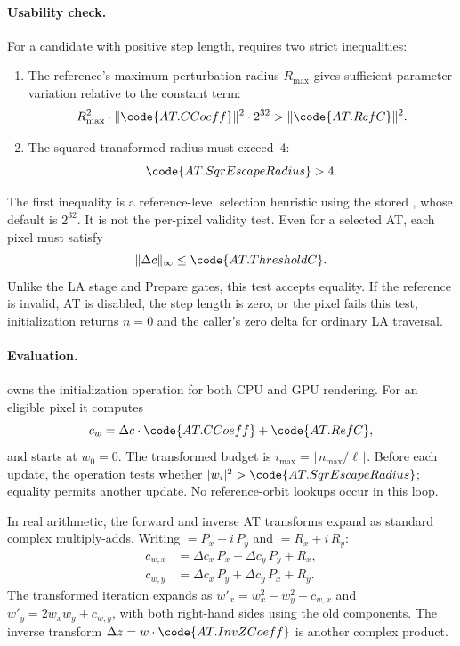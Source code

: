 \paragraph{Usability check.}
\label{sec:at-usability}
For a candidate with positive step length, 
requires two strict inequalities:
\begin{enumerate}
  \item The reference's maximum perturbation radius $R_{\max}$ gives
        sufficient parameter variation relative to the constant term:
        \[
        R_{\max}^2 \cdot \lVert\code{AT.CCoeff}\rVert^2 \cdot 2^{32}
          > \lVert\code{AT.RefC}\rVert^2.
        \]
  \item The squared transformed radius must exceed~4:
        \[
        \code{AT.SqrEscapeRadius}>4.
        \]
\end{enumerate}
The first inequality is a reference-level selection heuristic using
the stored , whose default is $2^{32}$. It is not the
per-pixel validity test. Even for a selected AT, each pixel must satisfy
\[
\lVert\Delta c\rVert_\infty\le\code{AT.ThresholdC}.
\]
Unlike the LA stage and Prepare gates, this test accepts equality.
If the reference is invalid, AT is disabled, the step length is zero,
or the pixel fails this test, initialization returns $n=0$ and the
caller's zero delta for ordinary LA traversal.

\paragraph{Evaluation.}
 owns the initialization operation for
both CPU and GPU rendering. For an eligible pixel it computes
\[
c_w = \Delta c \cdot \code{AT.CCoeff} + \code{AT.RefC},
\]
and starts at $w_0=0$. The transformed budget is
$i_{\max}=\lfloor n_{\max}/\ell\rfloor$. Before each update, the
operation tests whether $|w_i|^2>\code{AT.SqrEscapeRadius}$; equality
permits another update. No reference-orbit lookups occur in this loop.

In real arithmetic, the forward and inverse AT transforms expand as standard
complex multiply-adds.  Writing  $= P_x + i\,P_y$ and
 $= R_x + i\,R_y$:
\begin{align}
c_{w,x} &= \Delta c_x\,P_x - \Delta c_y\,P_y + R_x, \\
c_{w,y} &= \Delta c_x\,P_y + \Delta c_y\,P_x + R_y.
\end{align}
The transformed iteration expands as
$w'_x=w_x^2-w_y^2+c_{w,x}$ and
$w'_y=2w_xw_y+c_{w,y}$, with both right-hand sides using the old
components. The inverse transform
$\Delta z = w \cdot \code{AT.InvZCoeff}$ is another complex product.

